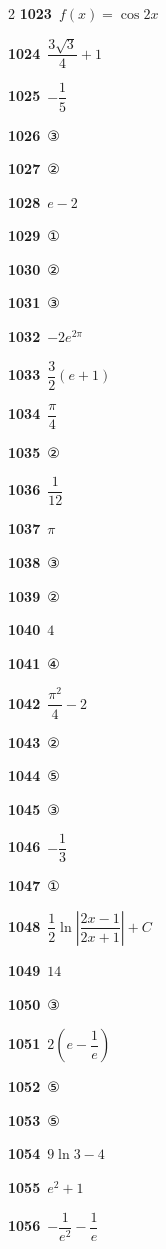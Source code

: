 \documentclass[10pt,a4paper]{article}
\begin{document}
\begin{multicols}{2}
\noindent\textbf{1023}\ $f(x)=\cos 2x$\par
\noindent\textbf{1024}\ $\dfrac{3\sqrt{3}}{4}+1$\par
\noindent\textbf{1025}\ $-\dfrac{1}{5}$\par
\noindent\textbf{1026}\ ③\par
\noindent\textbf{1027}\ ②\par
\noindent\textbf{1028}\ $e-2$\par
\noindent\textbf{1029}\ ①\par
\noindent\textbf{1030}\ ②\par
\noindent\textbf{1031}\ ③\par
\noindent\textbf{1032}\ $-2e^{2\pi}$\par
\noindent\textbf{1033}\ $\dfrac{3}{2}(e+1)$\par
\noindent\textbf{1034}\ $\dfrac{\pi}{4}$\par
\noindent\textbf{1035}\ ②\par
\noindent\textbf{1036}\ $\dfrac{1}{12}$\par
\noindent\textbf{1037}\ $\pi$\par
\noindent\textbf{1038}\ ③\par
\noindent\textbf{1039}\ ②\par
\noindent\textbf{1040}\ $4$\par
\noindent\textbf{1041}\ ④\par
\noindent\textbf{1042}\ $\dfrac{\pi^2}{4}-2$\par
\noindent\textbf{1043}\ ②\par
\noindent\textbf{1044}\ ⑤\par
\noindent\textbf{1045}\ ③\par
\noindent\textbf{1046}\ $-\dfrac{1}{3}$\par
\noindent\textbf{1047}\ ①\par
\noindent\textbf{1048}\ $\dfrac{1}{2}\ln\left|\dfrac{2x-1}{2x+1}\right|+C$\par
\noindent\textbf{1049}\ $14$\par
\noindent\textbf{1050}\ ③\par
\noindent\textbf{1051}\ $2\left(e-\dfrac{1}{e}\right)$\par
\noindent\textbf{1052}\ ⑤\par
\noindent\textbf{1053}\ ⑤\par
\noindent\textbf{1054}\ $9\ln 3-4$\par
\noindent\textbf{1055}\ $e^2+1$\par
\noindent\textbf{1056}\ $-\dfrac{1}{e^2}-\dfrac{1}{e}$\par

\end{multicols}
\end{document}
